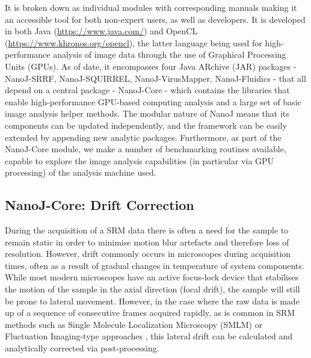  It is broken down as individual modules with corresponding manuals making it an accessible tool for both non-expert users, as well as developers. It is developed in both Java (\href{https://www.java.com/}{https://www.java.com/}) and OpenCL (\href{https://www.khronos.org/opencl}{https://www.khronos.org/opencl}), the latter language being used for high-performance analysis of image data through the use of Graphical Processing Units (GPUs). As of date, it encompasses four Java ARchive (JAR) packages - NanoJ-SRRF, NanoJ-SQUIRREL, NanoJ-VirusMapper, NanoJ-Fluidics - that all depend on a central package - NanoJ-Core - which contains the libraries that enable high-performance GPU-based computing analysis and a large set of basic image analysis helper methods. The modular nature of NanoJ means that its components can be updated independently, and the framework can be easily extended by appending new analytic packages. Furthermore, as part of the NanoJ-Core module, we make a number of benchmarking routines available, capable to explore the image analysis capabilities (in particular via GPU processing) of the analysis machine used.

\subsection*{NanoJ-Core: Drift Correction}
 During the acquisition of a SRM data there is often a need for the sample to remain static in order to minimise motion blur artefacts and therefore loss of resolution. However, drift commonly occurs in microscopes during acquisition times, often as a result of gradual changes in temperature of system components. While most modern microscopes have an active focus-lock device that stabilises the motion of the sample in the axial direction (focal drift), the sample will still be prone to lateral movement. However, in the case where the raw data is made up of a sequence of consecutive frames acquired rapidly, as is common in SRM methods such as Single Molecule Localization Microscopy (SMLM) \cite{betzig2006imaging,rust2006sub} or Fluctuation Imaging-type approaches \cite{gustafsson2016fast,dertinger2009fast,cox2012bayesian}, this lateral drift can be calculated and analytically corrected via post-processing.


